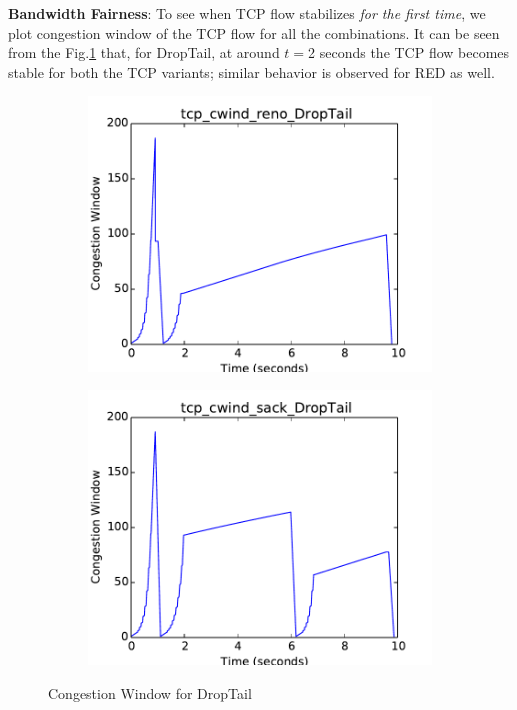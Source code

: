 \documentclass[USenglish,oneside,twocolumn]{article}
\begin{document}
\noindent\textbf{Bandwidth Fairness}: To see when TCP flow stabilizes \textit{for the first time}, we plot congestion window of the TCP flow for all the combinations. It can be seen from the Fig.\ref{cwind_dt} that, for DropTail, at around $t = $2 seconds the TCP flow becomes stable for both the TCP variants; similar behavior is observed for RED as well.
\begin{figure}[h]
\captionsetup{justification=centering}
    \centering
    \begin{subfigure}{0.5\linewidth}
        \centering
        \includegraphics[width=\linewidth]{fig/tcp_cwind_reno_DropTail.pdf} %
    \end{subfigure}\hfill
    \begin{subfigure}{0.5\linewidth}
        \centering
        \includegraphics[width=\linewidth]{fig/tcp_cwind_sack_DropTail.pdf} %
    \end{subfigure}
\caption{Congestion Window for DropTail}
\label{cwind_dt}
\end{figure}
\end{document}

